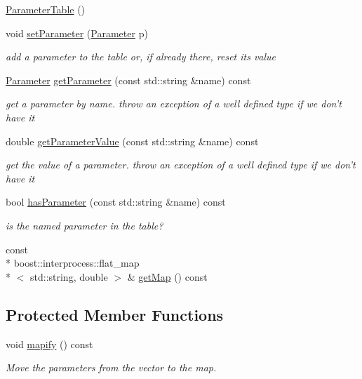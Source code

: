 \begin{DoxyCompactItemize}
\item 
\hyperlink{class_neutrino_flux_reweight_1_1_parameter_table_ae86246f4fd43bf1c7b6f4b62ed6264e8}{Parameter\-Table} ()
\item 
void \hyperlink{class_neutrino_flux_reweight_1_1_parameter_table_a7523c0cc9f0e3f7e648b3d228eb69ec7}{set\-Parameter} (\hyperlink{namespace_neutrino_flux_reweight_aa1e1a244ea4addfb793b4e316e6c0a72}{Parameter} p)
\begin{DoxyCompactList}\small\item\em add a parameter to the table or, if already there, reset its value \end{DoxyCompactList}\item 
\hyperlink{namespace_neutrino_flux_reweight_aa1e1a244ea4addfb793b4e316e6c0a72}{Parameter} \hyperlink{class_neutrino_flux_reweight_1_1_parameter_table_ae8f523d62145ab49b3a84e689190332b}{get\-Parameter} (const std\-::string \&name) const 
\begin{DoxyCompactList}\small\item\em get a parameter by name. throw an exception of a well defined type if we don't have it \end{DoxyCompactList}\item 
double \hyperlink{class_neutrino_flux_reweight_1_1_parameter_table_acb7dc8335b65b116f6092f2fa57ca5ed}{get\-Parameter\-Value} (const std\-::string \&name) const 
\begin{DoxyCompactList}\small\item\em get the value of a parameter. throw an exception of a well defined type if we don't have it \end{DoxyCompactList}\item 
bool \hyperlink{class_neutrino_flux_reweight_1_1_parameter_table_a525c3a34a2468513b68e36c230a5e9fa}{has\-Parameter} (const std\-::string \&name) const 
\begin{DoxyCompactList}\small\item\em is the named parameter in the table? \end{DoxyCompactList}\item 
const \\*
boost\-::interprocess\-::flat\-\_\-map\\*
$<$ std\-::string, double $>$ \& \hyperlink{class_neutrino_flux_reweight_1_1_parameter_table_a5438f5f53449e8dc1a12dfff2b9d922f}{get\-Map} () const 
\end{DoxyCompactItemize}
\subsection*{Protected Member Functions}
\begin{DoxyCompactItemize}
\item 
void \hyperlink{class_neutrino_flux_reweight_1_1_parameter_table_a9f4b1dfd17971c027c20c54d9f0229f8}{mapify} () const 
\begin{DoxyCompactList}\small\item\em Move the parameters from the vector to the map. \end{DoxyCompactList}\end{DoxyCompactItemize}
